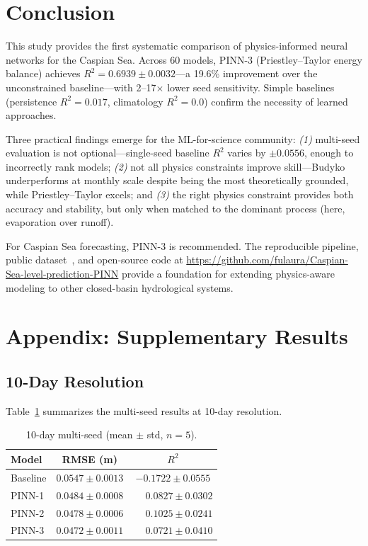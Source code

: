 \documentclass[conference,a4paper]{IEEEtran}
\begin{document}
\section{Conclusion}

This study provides the first systematic comparison of physics-informed neural networks for the Caspian Sea. Across 60 models, PINN-3 (Priestley--Taylor energy balance) achieves $R^2{=}0.6939{\pm}0.0032$---a 19.6\% improvement over the unconstrained baseline---with 2--17$\times$ lower seed sensitivity. Simple baselines (persistence $R^2{=}0.017$, climatology $R^2{=}0.0$) confirm the necessity of learned approaches.

Three practical findings emerge for the ML-for-science community: \textit{(1)} multi-seed evaluation is not optional---single-seed baseline $R^2$ varies by $\pm0.0556$, enough to incorrectly rank models; \textit{(2)} not all physics constraints improve skill---Budyko underperforms at monthly scale despite being the most theoretically grounded, while Priestley--Taylor excels; and \textit{(3)} the right physics constraint provides both accuracy and stability, but only when matched to the dominant process (here, evaporation over runoff).

For Caspian Sea forecasting, PINN-3 is recommended. The reproducible pipeline, public dataset~\cite{hersbach2020era5,munoz2021eraland,rodell2004gldas,schwatke2015dahiti,grimaldi2022glofas}, and open-source code at \url{https://github.com/fulaura/Caspian-Sea-level-prediction-PINN} provide a foundation for extending physics-aware modeling to other
closed-basin hydrological systems.

\section*{Appendix: Supplementary Results}

\subsection{10-Day Resolution}

Table~\ref{tab:10day} summarizes the multi-seed results at 10-day resolution.

\begin{table}[htbp]
\centering
\caption{10-day multi-seed (mean $\pm$ std, $n{=}5$).}
\label{tab:10day}
\begin{tabular}{lcc}
\toprule
\textbf{Model} & \textbf{RMSE (m)} & \textbf{$R^2$} \\
\midrule
Baseline & $0.0547{\pm}0.0013$ & $-0.1722{\pm}0.0555$ \\
PINN-1   & $0.0484{\pm}0.0008$ & $\phantom{-}0.0827{\pm}0.0302$ \\
PINN-2   & $0.0478{\pm}0.0006$ & $\phantom{-}0.1025{\pm}0.0241$ \\
PINN-3   & $0.0472{\pm}0.0011$ & $\phantom{-}0.0721{\pm}0.0410$ \\
\bottomrule
\end{tabular}
\end{table}
\end{document}
